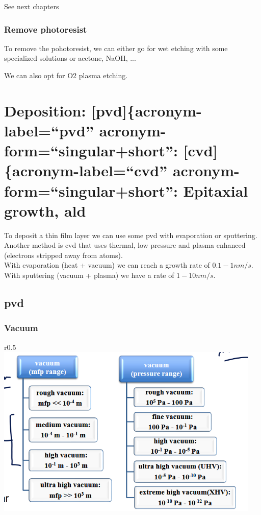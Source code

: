\documentclass[
]{article}
\begin{document}
See next chapters

\hypertarget{remove-photoresist}{%
\subsubsection{Remove photoresist}\label{remove-photoresist}}

To remove the pohotoresist, we can either go for wet etching with some
specialized solutions or acetone, NaOH, ...

We can also opt for O2 plasma etching.

\hypertarget{deposition-pvdacronym-labelpvd-acronym-formsingularshort-cvdacronym-labelcvd-acronym-formsingularshort-epitaxial-growth-ald}{%
\section{\texorpdfstring{Deposition: {[}pvd{]}\{acronym-label=``pvd''
acronym-form=``singular+short'': {[}cvd{]}\{acronym-label=``cvd''
acronym-form=``singular+short'': Epitaxial growth,
{ald}}{Deposition: {[}pvd{]}\{acronym-label=``pvd'' acronym-form=``singular+short'': {[}cvd{]}\{acronym-label=``cvd'' acronym-form=``singular+short'': Epitaxial growth, ald}}\label{deposition-pvdacronym-labelpvd-acronym-formsingularshort-cvdacronym-labelcvd-acronym-formsingularshort-epitaxial-growth-ald}}

To deposit a thin film layer we can use some {pvd} with evaporation or
sputtering. Another method is {cvd} that uses thermal, low pressure and
plasma enhanced (electrons stripped away from atoms).\\
With evaporation (heat + vacuum) we can reach a growth rate of
\(0.1-1 nm/s\). With sputtering (vacuum + plasma) we have a rate of
\(1-10nm/s\).

\hypertarget{pvd}{%
\subsection{\texorpdfstring{{pvd}}{pvd}}\label{pvd}}

\hypertarget{vacuum}{%
\subsubsection{Vacuum}\label{vacuum}}

r0.5
\includegraphics[width=0.95\textwidth,height=\textheight]{vacuum.png}
\end{document}
